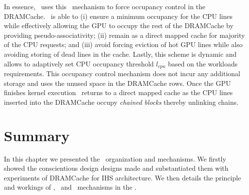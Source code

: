 \par In essence, \cachename\ uses this \chaining\ mechanism to force occupancy control in the DRAMCache. \chaining\ is able to 
(i) ensure a minimum occupancy for the CPU lines while effectively allowing the GPU to occupy the rest of the DRAMCache by providing pseudo-associativity;
(ii) remain as a direct mapped cache for majority of the CPU requests; and
(iii) avoid forcing eviction of hot GPU lines while also avoiding storing of dead lines in the cache.
Lastly, this scheme is dynamic and allows to adaptively set CPU occupancy threshold \textit{$l_{cpu}$} based on the workloads requirements. This occupancy control mechanism does not incur any additional storage and uses the unused space in the DRAMCache rows. Once the GPU finishes kernel execution \cachename\ returns to a direct mapped cache as the CPU lines inserted into the DRAMCache occupy \textit{chained blocks} thereby unlinking chains. 

\vspace{-1em}
\section{Summary}
In this chapter we presented the \cachename\ organization and mechanisms. We firstly showed the conscientious design designs made and substantiated them with experiments of DRAMCache for IHS architecture. We then details the principle and workings of \prioname, \bypassname\ and \chaining\ mechanisms in the \cachename.

